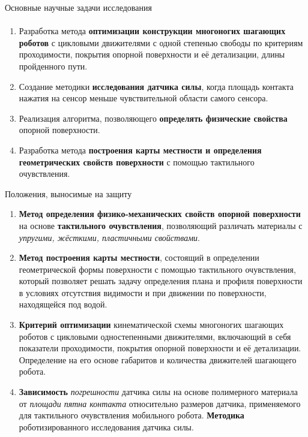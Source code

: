 \begin{frame}[t]{Основные научные задачи исследования}
    \framesubtitle{}
    \begin{enumerate}
        \item Разработка метода \textbf{оптимизации конструкции многоногих шагающих роботов} с цикловыми движителями с одной степенью свободы по критериям проходимости, покрытия опорной поверхности и её детализации, длины пройденного пути.
        \item Создание методики \textbf{исследования датчика силы}, когда площадь контакта нажатия на сенсор меньше чувствительной области самого сенсора.
        \item Реализация алгоритма, позволяющего \textbf{определять физические свойства} опорной поверхности.
        \item  Разработка метода \textbf{построения карты местности и определения геометрических свойств поверхности} с помощью тактильного очувствления.
    \end{enumerate}
\end{frame}



\begin{frame}{Положения, выносимые на защиту}
    \begin{enumerate}
        \vspace{-0.3cm}
        \small
        \item \textbf{Метод определения физико-механических свойств опорной поверхности} на основе \textbf{тактильного очувствления}, позволяющий различать материалы с \textit{упругими, жёсткими, пластичными свойствами}.
        \item \textbf{Метод построения карты местности}, состоящий в определении геометрической формы поверхности с помощью тактильного очувствления, который позволяет решать задачу определения плана и профиля поверхности в условиях отсутствия видимости и при движении по поверхности, находящейся под водой.
        \item \textbf{Критерий оптимизации} кинематической схемы многоногих шагающих роботов с цикловыми одностепенными движителями, включающий в себя показатели проходимости, покрытия опорной поверхности и её детализации. Определение на его основе габаритов и количества движителей шагающего робота.
        \item \textbf{Зависимость} \textit{погрешности} датчика силы на основе полимерного материала от \textit{площади пятна контакта} относительно размеров датчика, применяемого для тактильного очувствления мобильного робота. \textbf{Методика} роботизированного исследования датчика силы.
    \end{enumerate}
\end{frame}

